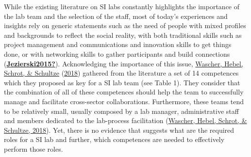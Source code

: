 \documentclass[]{elsarticle} %
\begin{document}
While the existing literature on SI labs constantly highlights the
importance of the lab team and the selection of the staff, most of
today's experiences and insights rely on generic statements such as the
need of people with mixed profiles and backgrounds to reflect the social
reality, with both traditional skills such as project management and
communications and innovation skills to get things done, or with
networking skills to gather participants and build connections
(\protect\hyperlink{ref-Jezierski2015}{\textbf{Jezierski2015?}}).
Acknowledging the importance of this issue,
\protect\hyperlink{ref-Wascher2018}{Wascher, Hebel, Schrot, \& Schultze}
(\protect\hyperlink{ref-Wascher2018}{2018}) gathered from the literature
a set of 14 competences which they proposed as key for a SI lab team
(see Table 1). They consider that the combination of all of these
competences should help the team to successfully manage and facilitate
cross-sector collaborations. Furthermore, these teams tend to be
relatively small, usually composed by a lab manager, administrative
staff and members dedicated to the lab-process facilitation
(\protect\hyperlink{ref-Wascher2018}{Wascher, Hebel, Schrot, \&
Schultze, 2018}). Yet, there is no evidence that suggests what are the
required roles for a SI lab and further, which competences are needed to
effectively perform those roles.

\providecommand{\docline}[3]{\noalign{\global\setlength{\arrayrulewidth}{#1}}\arrayrulecolor[HTML]{#2}\cline{#3}}

\setlength{\tabcolsep}{2pt}

\renewcommand*{\arraystretch}{1.5}
\end{document}
